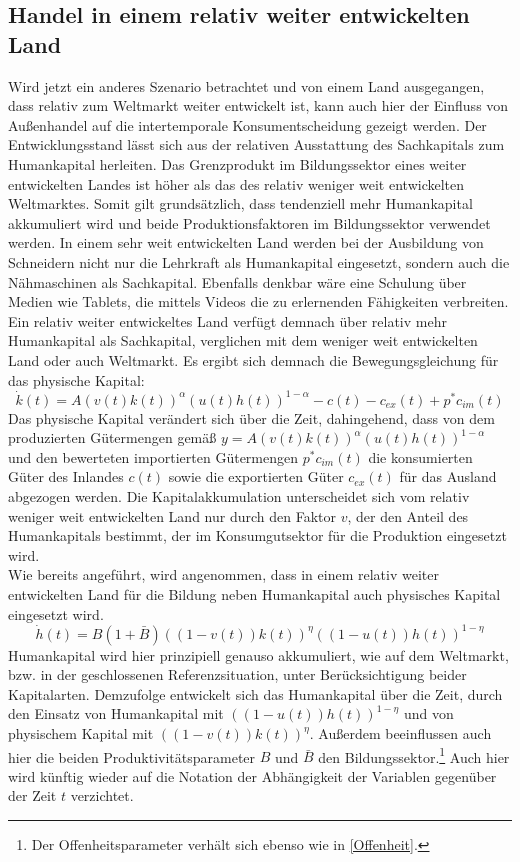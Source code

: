\subsection{Handel in einem relativ weiter entwickelten Land}
Wird jetzt ein anderes Szenario betrachtet und von einem Land ausgegangen, dass relativ zum Weltmarkt weiter entwickelt ist, kann auch hier der Einfluss von Au{\ss}enhandel auf die intertemporale Konsumentscheidung gezeigt werden. Der Entwicklungsstand lässt sich aus der relativen Ausstattung des Sachkapitals zum Humankapital herleiten. Das Grenzprodukt im Bildungssektor eines weiter entwickelten Landes ist höher als das des relativ weniger weit entwickelten Weltmarktes. Somit gilt grundsätzlich, dass tendenziell mehr Humankapital akkumuliert wird und beide Produktionsfaktoren im Bildungssektor verwendet werden. In einem sehr weit entwickelten Land werden bei der Ausbildung von Schneidern nicht nur die Lehrkraft als Humankapital eingesetzt, sondern auch die Nähmaschinen als Sachkapital. Ebenfalls denkbar wäre eine Schulung über Medien wie Tablets, die mittels Videos die zu erlernenden Fähigkeiten verbreiten.\\ Ein relativ weiter entwickeltes Land verfügt demnach über relativ mehr Humankapital als Sachkapital, verglichen mit dem weniger weit entwickelten Land oder auch Weltmarkt. Es ergibt sich demnach die Bewegungsgleichung für das physische Kapital:
\begin{equation}
\dot{k}(t)=A(v(t)k(t))^\alpha(u(t)h(t))^{1-\alpha}-c(t)-c_{ex}(t)+p^*c_{im}(t)
\end{equation}
Das physische Kapital verändert sich über die Zeit, dahingehend, dass von dem produzierten Gütermengen gemä{\ss} $y=A(v(t)k(t))^\alpha(u(t)h(t))^{1-\alpha}$ und den bewerteten importierten Gütermengen $p^*c_{im}(t)$ die konsumierten Güter des Inlandes $c(t)$ sowie die exportierten Güter $c_{ex}(t)$ für das Ausland abgezogen werden. Die Kapitalakkumulation unterscheidet sich vom relativ weniger weit entwickelten Land nur durch den Faktor $v$, der den Anteil des Humankapitals bestimmt, der im Konsumgutsektor für die Produktion eingesetzt wird.\\   
Wie bereits angeführt, wird angenommen, dass in einem relativ weiter entwickelten Land für die Bildung neben Humankapital auch physisches Kapital eingesetzt wird.
\begin{equation}
\dot{h}(t)=B(1+\bar{B})((1-v(t))k(t))^{\eta}((1-u(t))h(t))^{1-\eta}
\end{equation}
Humankapital wird hier prinzipiell genauso akkumuliert, wie auf dem Weltmarkt, bzw. in der geschlossenen Referenzsituation, unter Berücksichtigung beider Kapitalarten. Demzufolge entwickelt sich das Humankapital über die Zeit, durch den Einsatz von Humankapital mit $((1-u(t))h(t))^{1-\eta}$ und von physischem Kapital mit $((1-v(t))k(t))^{\eta}$. Au{\ss}erdem beeinflussen auch hier die beiden Produktivitätsparameter $B$ und $\bar{B}$ den Bildungssektor.\footnote{Der Offenheitsparameter verhält sich ebenso wie in \eqref{Offenheit}.} Auch hier wird künftig wieder auf die Notation der Abhängigkeit der Variablen gegenüber der Zeit $t$ verzichtet.\\
